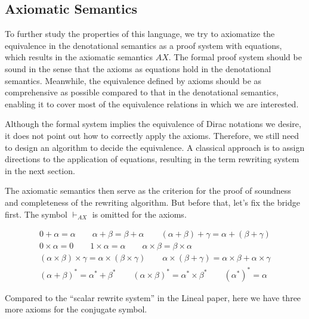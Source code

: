 \documentclass[manuscript, review, timestamp]{acmart}
\begin{document}
\subsection{Axiomatic Semantics}

To further study the properties of this language, we try to axiomatize the equivalence in the denotational semantics as a proof system with equations, which results in the axiomatic semantics $AX$. The formal proof system should be sound in the sense that the axioms as equations hold in the denotational semantics. Meanwhile, the equivalence defined by axioms should be as comprehensive as possible compared to that in the denotational semantics, enabling it to cover most of the equivalence relations in which we are interested.

Although the formal system implies the equivalence of Dirac notations we desire, it does not point out how to correctly apply the axioms. Therefore, we still need to design an algorithm to decide the equivalence. A classical approach is to assign directions to the application of equations, resulting in the term rewriting system in the next section.

The axiomatic semantics then serve as the criterion for the proof of soundness and completeness of the rewriting algorithm. But before that, let's fix the bridge first.
The symbol $\vdash_{AX}$ is omitted for the axioms.

\begin{definition}
  \begin{gather*}
    0 + \alpha = \alpha
    \qquad
    \alpha + \beta = \beta + \alpha
    \qquad
    (\alpha + \beta) + \gamma = \alpha + (\beta + \gamma) \\
    0 \times \alpha = 0
    \qquad
    1 \times \alpha = \alpha
    \qquad
    \alpha \times \beta = \beta \times \alpha \\
    (\alpha \times \beta) \times \gamma = \alpha \times (\beta \times \gamma) \qquad
    \alpha \times (\beta + \gamma) = \alpha \times \beta + \alpha \times \gamma \\
    (\alpha + \beta)^* = \alpha^* + \beta^*
    \qquad
    (\alpha \times \beta)^* = \alpha^* \times \beta^*
    \qquad
    (\alpha^*)^* = \alpha
  \end{gather*}
\end{definition}
Compared to the ``scalar rewrite system'' in the Lineal paper\cite{Arrighi2017}, here we have three more axioms for the conjugate symbol.
\end{document}
